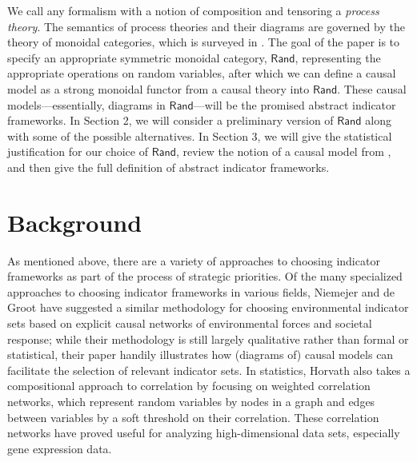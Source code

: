 \documentclass[sigconf]{acmart}
\newcommand{\Cat}[1]{\mathsf{#1}}
\def\Ind{\Cat{Ind}}
\def\Rand{\Cat{Rand}}
\def\Stoch{\Cat{Stoch}}
\begin{document}
We call any formalism with a notion of composition and tensoring a \emph{process theory}. The semantics of process theories and their diagrams are governed by the theory of monoidal categories, which is surveyed in \cite{selinger09}. The goal of the paper is to specify an appropriate symmetric monoidal category, $\Rand$, representing the appropriate operations on random variables, after which we can define a causal model as a strong monoidal functor from a causal theory into $\Rand$. These causal models---essentially, diagrams in $\Rand$---will be the promised abstract indicator frameworks. In Section 2, we will consider a preliminary version of $\Rand$ along with some of the possible alternatives. In Section 3, we will give the statistical justification for our choice of $\Rand$, review the notion of a causal model from \cite{fong13}, and then give the full definition of abstract indicator frameworks.



\section{Background}
As mentioned above, there are a variety of approaches to choosing indicator frameworks as part of the process of strategic priorities. Of the many specialized approaches to choosing indicator frameworks in various fields, Niemejer and de Groot \cite{niemeijer08} have suggested a similar methodology for choosing environmental indicator sets based on explicit causal networks of environmental forces and societal response; while their methodology is still largely qualitative rather than formal or statistical, their paper handily illustrates how (diagrams of) causal models can facilitate the selection of relevant indicator sets. In statistics, Horvath \cite{horvath11} also takes a compositional approach to correlation by focusing on weighted correlation networks, which represent random variables by nodes in a graph and edges between variables by a soft threshold on their correlation. These correlation networks have proved useful for analyzing high-dimensional data sets, especially gene expression data. %
\end{document}

